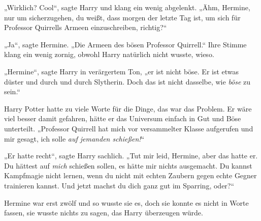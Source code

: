 „Wirklich? Cool“, sagte Harry und klang ein wenig abgelenkt. „Ähm, Hermine, nur um sicherzugehen, du weißt, dass morgen der letzte Tag ist, um sich für Professor Quirrells Armeen einzuschreiben, richtig?“

„Ja“, sagte Hermine. „Die Armeen des bösen Professor Quirrell.“ Ihre Stimme klang ein wenig zornig, obwohl Harry natürlich nicht wusste, wieso.

„Hermine“, sagte Harry in verärgertem Ton, „er ist nicht böse. Er ist etwas düster und durch und durch Slytherin. Doch das ist nicht dasselbe, wie \emph{böse} zu sein.“

Harry Potter hatte zu viele Worte für die Dinge, das war das Problem. Er wäre viel besser damit gefahren, hätte er das Universum einfach in Gut und Böse unterteilt. „Professor Quirrell hat mich vor versammelter Klasse aufgerufen und mir gesagt, ich solle \emph{auf jemanden schießen!}“

„Er hatte recht“, sagte Harry sachlich. „Tut mir leid, Hermine, aber das hatte er. Du hättest auf \emph{mich} schießen sollen, es hätte mir nichts ausgemacht. Du kannst Kampfmagie nicht lernen, wenn du nicht mit echten Zaubern gegen echte Gegner trainieren kannst. Und jetzt machst du dich ganz gut im Sparring, oder?“

Hermine war erst zwölf und so wusste sie es, doch sie konnte es nicht in Worte fassen, sie wusste nichts zu sagen, das Harry überzeugen würde.

